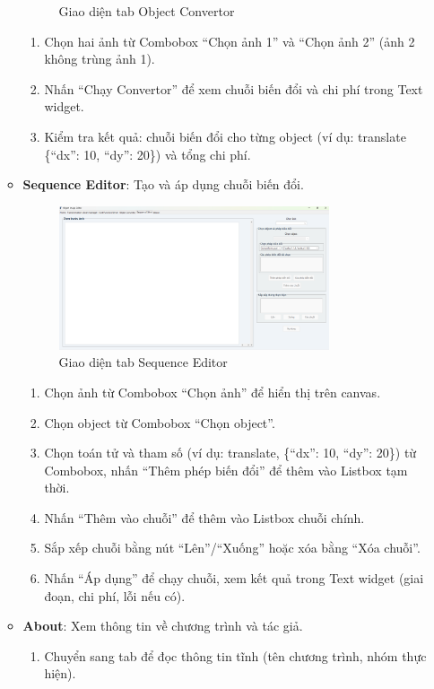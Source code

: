 \documentclass[a4paper,12pt]{article}
\begin{document}
\begin{enumerate}
\begin{itemize}
\begin{figure}[H]
    \caption{Giao diện tab Object Convertor}
    \label{fig:tlm_tab}
\end{figure}
        \begin{enumerate}
            \item Chọn hai ảnh từ Combobox ``Chọn ảnh 1'' và ``Chọn ảnh 2'' (ảnh 2 không trùng ảnh 1).
            \item Nhấn ``Chạy Convertor'' để xem chuỗi biến đổi và chi phí trong Text widget.
            \item Kiểm tra kết quả: chuỗi biến đổi cho từng object (ví dụ: translate \{``dx'': 10, ``dy'': 20\}) và tổng chi phí.
        \end{enumerate}
        \item \textbf{Sequence Editor}: Tạo và áp dụng chuỗi biến đổi.
        \begin{figure}[H]
    \centering
    \includegraphics[width=0.8\textwidth]{SE.png}
    \caption{Giao diện tab Sequence Editor}
    \label{fig:tlm_tab}
\end{figure}
        \begin{enumerate}
            \item Chọn ảnh từ Combobox ``Chọn ảnh'' để hiển thị trên canvas.
            \item Chọn object từ Combobox ``Chọn object''.
            \item Chọn toán tử và tham số (ví dụ: translate, \{``dx'': 10, ``dy'': 20\}) từ Combobox, nhấn ``Thêm phép biến đổi'' để thêm vào Listbox tạm thời.
            \item Nhấn ``Thêm vào chuỗi'' để thêm vào Listbox chuỗi chính.
            \item Sắp xếp chuỗi bằng nút ``Lên''/``Xuống'' hoặc xóa bằng ``Xóa chuỗi''.
            \item Nhấn ``Áp dụng'' để chạy chuỗi, xem kết quả trong Text widget (giai đoạn, chi phí, lỗi nếu có).
        \end{enumerate}
        \item \textbf{About}: Xem thông tin về chương trình và tác giả.
        \begin{enumerate}
            \item Chuyển sang tab để đọc thông tin tĩnh (tên chương trình, nhóm thực hiện).
        \end{enumerate}
    \end{itemize}
\end{enumerate}
\end{document}
